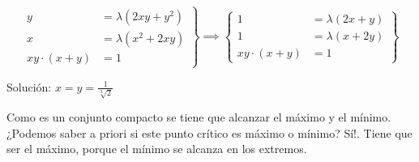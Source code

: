 \begin{problem}[?]
\[\left.\begin{array}{cc} y&= \lambda (2xy + y^2)\\
x&= \lambda(x^2+2xy)\\
xy\cdot(x+y) &= 1\end{array}\right\}\implies
\left\{
\begin{array}{cc}
1&= \lambda(2x+y)\\
1&= \lambda(x+2y)\\
xy\cdot(x+y) &= 1
\end{array}\right\} 
\]

Solución: $x=y = \frac{1}{\sqrt[3]{2}}$

Como es un conjunto compacto se tiene que alcanzar el máximo y el mínimo. ¿Podemos saber a priori si este punto crítico es máximo o mínimo? Sí!. Tiene que ser el máximo, porque el mínimo se alcanza en los extremos.

\end{problem}